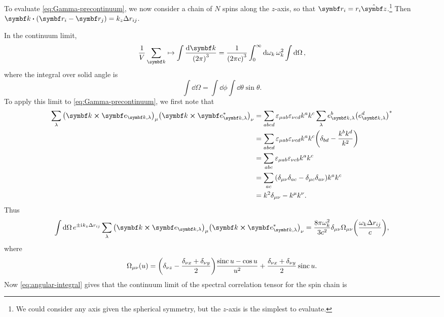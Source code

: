 \documentclass[../thesis.tex]{subfiles}
\begin{document}
To evaluate \cref{eq:Gamma-precontinuum}, we now consider a chain of $N$ spins
along the $z$-axis, so that $\vq{r}_i = r_i \vu{z}$.\footnote{We could consider
any axis given the spherical symmetry, but the $z$-axis is the simplest to
evaluate.} Then $\vq{k} \vdot (\vq{r}_i - \vq{r}_j) = k_z \Delta r_{ij}$.

In the continuum limit,
\begin{equation}
  \frac{1}{V}\sum_{\vq{k}}
  \mapsto
  \int \frac{\dd{\vq{k}}}{{(2\pi)}^3}
  = \frac{1}{{(2\pi c)}^3} \int_0^\infty \dd{\omega_k} \omega_k^2
  \int\dd{\Omega},
\end{equation}
where the integral over solid angle is
\begin{equation}
  \int\dd{\Omega}
  = \int\dd{\phi}\int\dd{\theta}\sin\theta.
  \label{eq:solid-angle}
\end{equation}
To apply this limit to \cref{eq:Gamma-precontinuum}, we first note that
\begin{align}
  \sum_\lambda {\qty(\vq{k} \cross \vq{e}_{\vq{k},\lambda})}_\mu
  {\qty(\vq{k} \cross \vq{e}^*_{\vq{k},\lambda})}_\nu
  &= \sum_{abcd} \varepsilon_{\mu ab}\varepsilon_{\nu cd} k^a k^c 
  \sum_\lambda e_{\vq{k},\lambda}^b {\qty(e_{\vq{k},\lambda}^d)}^*
  \\
  &= \sum_{abcd} \varepsilon_{\mu ab}\varepsilon_{\nu cd} k^a k^c 
  \qty(\delta_{bd} - \frac{k^b k^d}{k^2})
  \\
  &= \sum_{abc} \varepsilon_{\mu ab}\varepsilon_{\nu cb} k^a k^c 
  \\
  &= \sum_{ac} \qty(\delta_{\mu\nu}\delta_{ac} - \delta_{\mu c}\delta_{a\nu}) k^a k^c 
  \\
  &= k^2 \delta_{\mu\nu} - k^\mu k^\nu.
\end{align}
Thus
\begin{equation}
  \int\dd{\Omega} e^{\pm\im k_z \Delta r_{ij}}
  \sum_\lambda {\qty(\vq{k} \cross \vq{e}_{\vq{k},\lambda})}_\mu
  {\qty(\vq{k} \cross \vq{e}^*_{\vq{k},\lambda})}_\nu
  = \frac{8\pi\omega_k^2}{3c^2} \delta_{\mu\nu}
  \Omega_{\mu\nu}\qty(\frac{\omega_k\Delta r_{ij}}{c}),
  \label{eq:angular-integral}
\end{equation}
where
\begin{equation}
  \Omega_{\mu\nu}(u)
  = \qty(\delta_{\nu z} - \frac{\delta_{\nu x} + \delta_{\nu y}}{2})
  \frac{\operatorname{\mathrm{sinc}} u - \cos u}{u^2}
  + \frac{\delta_{\nu x} + \delta_{\nu y}}{2} \operatorname{\mathrm{sinc}} u.
\end{equation}
Now \cref{eq:angular-integral} gives that the continuum limit of the spectral
correlation tensor for the spin chain is
\end{document}
